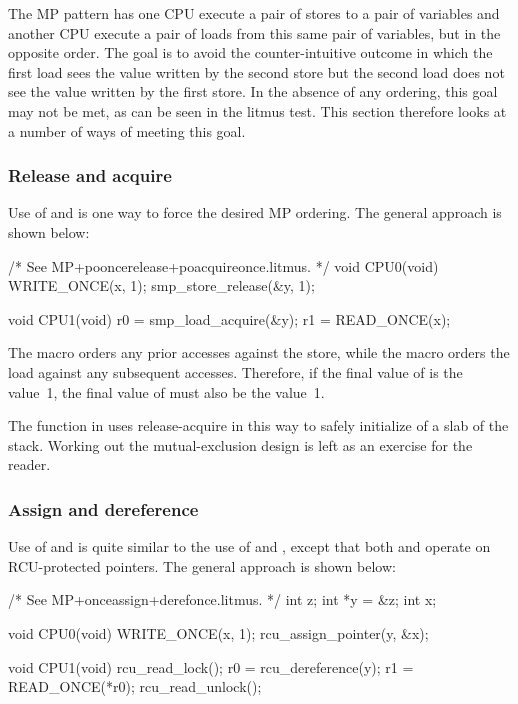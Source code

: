 The MP pattern has one CPU execute a pair of stores to a pair of variables
and another CPU execute a pair of loads from this same pair of variables,
but in the opposite order.
The goal is to avoid the counter-intuitive outcome in which the first load
sees the value written by the second store but the second load does not see
the value written by the first store.
In the absence of any ordering, this goal may not be met, as can be seen
in the  litmus test.
This section therefore looks at a number of ways of meeting this goal.


\subsubsection{Release and acquire}

Use of  and  is one way to force
the desired MP ordering.  The general approach is shown below:

\begin{VerbatimU}
	/* See MP+pooncerelease+poacquireonce.litmus. */
	void CPU0(void)
	{
		WRITE_ONCE(x, 1);
		smp_store_release(&y, 1);
	}

	void CPU1(void)
	{
		r0 = smp_load_acquire(&y);
		r1 = READ_ONCE(x);
	}
\end{VerbatimU}

The  macro orders any prior accesses against the
store, while the  macro orders the load against any
subsequent accesses.
Therefore, if the final value of  is the value~1, the final value
of  must also be the value~1.

The  function in  uses
release-acquire in this way to safely initialize of a slab of the stack.
Working out the mutual-exclusion design is left as an exercise for the reader.


\subsubsection{Assign and dereference}

Use of  and  is quite similar
to the use of  and , except
that both  and  operate on
RCU-protected pointers.
The general approach is shown below:

\begin{VerbatimU}
	/* See MP+onceassign+derefonce.litmus. */
	int z;
	int *y = &z;
	int x;

	void CPU0(void)
	{
		WRITE_ONCE(x, 1);
		rcu_assign_pointer(y, &x);
	}

	void CPU1(void)
	{
		rcu_read_lock();
		r0 = rcu_dereference(y);
		r1 = READ_ONCE(*r0);
		rcu_read_unlock();
	}
\end{VerbatimU}

